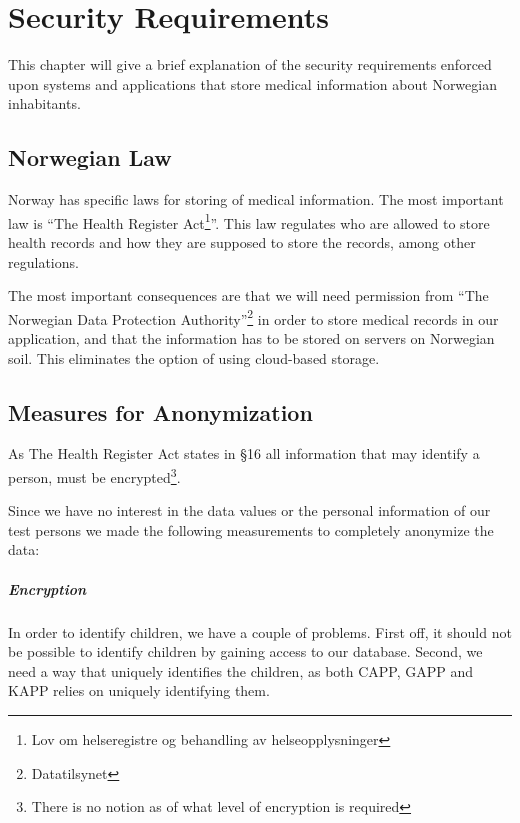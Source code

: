 \chapter{Security Requirements}
\label{chp:securityrequirements}

This chapter will give a brief explanation of the security requirements enforced upon systems and applications that store medical information about Norwegian inhabitants. 


\section{Norwegian Law}
\label{sec:helseregisterloven}

Norway has specific laws for storing of medical information. The most important law is ``The Health Register Act\footnote{Lov om helseregistre og behandling av helseopplysninger}''\cite{helseregisterloven}. This law regulates who are allowed to store health records and how they are supposed to store the records, among other regulations. 

The most important consequences are that we will need permission from ``The Norwegian Data Protection Authority''\footnote{Datatilsynet} in order to store medical records in our application, and that the information has to be stored on servers on Norwegian soil. This eliminates the option of using cloud-based storage. 


\section{Measures for Anonymization}
As The Health Register Act states in \S 16 \cite{helseregisterloven} all information that may identify a person, must be encrypted\footnote{There is no notion as of what level of encryption is required}. 

Since we have no interest in the data values or the personal information of our test persons we made the following measurements to completely anonymize the data:

\paragraph{Encryption}
In order to identify children, we have a couple of problems. First off, it should not be possible to identify children by gaining access to our database. Second, we need a way that uniquely identifies the children, as both CAPP, GAPP and KAPP relies on uniquely identifying them. 

